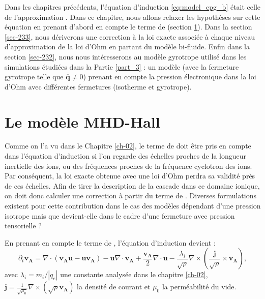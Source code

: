 Dans les chapitres précédents, l'équation d'induction \eqref{eq:model_cpg_b} était celle de l'approximation . Dans ce chapitre, nous allons relaxer les hypothèses sur cette équation en prenant d'abord en compte le terme de  (section \ref{sec-231}). Dans la section \ref{sec-233}, nous dériverons une correction à la loi exacte associée à chaque niveau d'approximation de la loi d'Ohm en partant du modèle bi-fluide. Enfin dans la section \ref{sec-232}, nous nous intéresserons au modèle gyrotrope utilisé dans les simulations étudiées dans la Partie \ref{part_3} : un modèle  (avec la fermeture  gyrotrope telle que $\overline{\overline{\boldsymbol{q}}} \neq 0$) prenant en compte la pression électronique dans la loi d'Ohm avec différentes fermetures (isotherme et gyrotrope). 
 
 \section{Le modèle MHD-Hall}
 \label{sec-231}
 
 Comme on l'a vu dans le Chapitre \ref{ch-02}, le terme de  doit être pris en compte dans l'équation d'induction si l'on regarde des échelles proches de la longueur inertielle des ions, ou des fréquences proches de la fréquence cyclotron des ions. Par conséquent, la loi exacte obtenue avec une loi d'Ohm  perdra sa validité près de ces échelles. Afin de tirer la description de la cascade dans ce domaine ionique, on doit donc calculer une correction à partir du terme de . Diverses formulations existent pour cette contribution dans le cas des modèles dépendant d'une pression isotrope mais que devient-elle dans le cadre d'une fermeture avec pression tensorielle ? 

En prenant en compte le terme de , l'équation d'induction devient : 
\begin{equation}
\label{eq:model_hall1} \partial_t \boldsymbol{v_A}  =   \nabla \cdot \left(\boldsymbol{v_A}\boldsymbol{u} - \boldsymbol{u}\boldsymbol{v_A}\right) -  \boldsymbol{u}  \nabla \cdot \boldsymbol{v_A} +  \frac{\boldsymbol{v_A}}{2}  \nabla \cdot \boldsymbol{u} - \frac{\lambda_i}{ \sqrt{\rho} } \nabla \times \left(\frac{\boldsymbol{j}}{\sqrt{\rho}}  \times \boldsymbol{v_A}\right) ,
\end{equation}
avec $\lambda_i = m_i/|q_e|$ une constante analysée dans le chapitre \ref{ch-02},  $\boldsymbol{j} = \frac{1}{\sqrt{\mu_0}} \nabla \times \left(\sqrt{\rho}\boldsymbol{v_A}\right)$ la densité de courant et $\mu_0$ la perméabilité du vide. 

